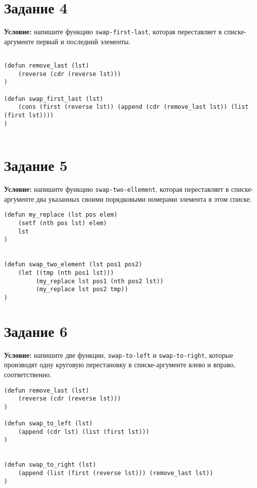 \section{Задание 4}

\textbf{Условие:} напишите функцию \texttt{swap-first-last}, которая переставляет в списке-аргументе первый и последний элементы.

\begin{lstlisting}

(defun remove_last (lst)
    (reverse (cdr (reverse lst)))
)

(defun swap_first_last (lst)
    (cons (first (reverse lst)) (append (cdr (remove_last lst)) (list (first lst))))
)
    
\end{lstlisting}


\section{Задание 5}

\textbf{Условие:} напишите функцию \texttt{swap-two-ellement}, которая переставляет в списке-аргументе два указанных своими порядковыми номерами элемента в этом списке.


\begin{lstlisting}
(defun my_replace (lst pos elem)
    (setf (nth pos lst) elem)
    lst
)


(defun swap_two_element (lst pos1 pos2)
    (let ((tmp (nth pos1 lst)))
         (my_replace lst pos1 (nth pos2 lst))
         (my_replace lst pos2 tmp))
)
\end{lstlisting}


\section{Задание 6}

\textbf{Условие:} напишите две функции, \texttt{swap-to-left} и \texttt{swap-to-right}, которые производят одну круговую перестановку в списке-аргументе влево и вправо, соответственно.

\begin{lstlisting}
(defun remove_last (lst)
    (reverse (cdr (reverse lst)))
)

(defun swap_to_left (lst)
    (append (cdr lst) (list (first lst)))
)


(defun swap_to_right (lst)
    (append (list (first (reverse lst))) (remove_last lst))
)  
\end{lstlisting}


